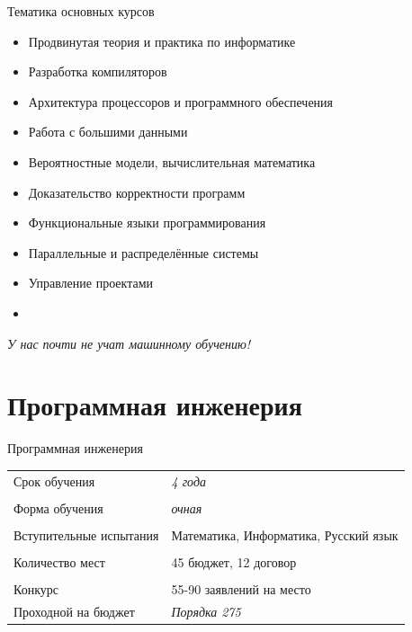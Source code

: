 \documentclass{slides-style}
\begin{document}
    \begin{frame}{Тематика основных курсов}
        \begin{itemize}
            \item Продвинутая теория и практика по информатике
            \item Разработка компиляторов
            \item Архитектура процессоров и программного обеспечения
            \item Работа с большими данными
            \item Вероятностные модели, вычислительная математика
            \item Доказательство корректности программ
            \item Функциональные языки программирования
            \item Параллельные и распределённые системы
            \item Управление проектами
            \item {}
        \end{itemize}

        \vspace{3mm}

        \emph{У нас почти не учат машинному обучению!}
    \end{frame}

    \section{Программная инженерия}

    \begin{frame}{Программная инженерия}
        \subtitle{Основная информация}
        \begin{center}
            \begin{tabular}{p{5cm} p{5cm}}
                Срок обучения           & \emph{4 года} \\
                \\
                Форма обучения          & \emph{очная} \\
                \\
                Вступительные испытания & Математика, \newline Информатика, \newline Русский язык \\
                \\
                Количество мест         & 45 бюджет, 12 договор \\
                \\
                Конкурс                 & 55-90 заявлений на место
                \\
                Проходной на бюджет     & \emph{Порядка 275}
            \end{tabular}
        \end{center}
    \end{frame}
\end{document}
